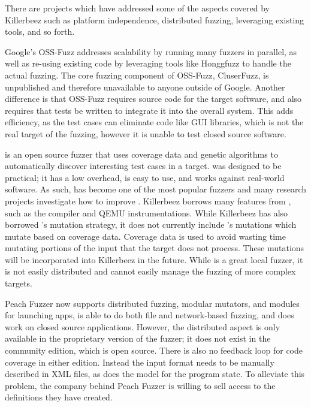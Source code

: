 There are projects which have addressed some of the aspects covered by Killerbeez
such as platform independence, distributed fuzzing, leveraging existing tools,
and so forth.

Google's OSS-Fuzz\cite{ossfuzz} addresses scalability by running many fuzzers
in parallel, as well as re-using existing code by leveraging tools like
Honggfuzz to handle the actual fuzzing. The core fuzzing component of OSS-Fuzz,
CluserFuzz, is unpublished and therefore unavailable to anyone outside of
Google.  Another difference is that OSS-Fuzz requires source code for the
target software, and also requires that tests be written to integrate it
into the overall system. This adds efficiency, as the test cases can eliminate
code like GUI libraries, which is not the real target of the fuzzing, however
it is unable to test closed source software.

\AFL{}\cite{afl} is an open source fuzzer that uses coverage data and genetic
algorithms to automatically discover interesting test cases in a target.  \AFL{}
was designed to be practical; it has a low overhead, is easy to use, and works
against real-world software. As such, \AFL{} has become one of the most popular
fuzzers and many research projects investigate how to improve \AFL{}. Killerbeez
borrows many features from \AFL{}, such as the compiler and QEMU
instrumentations. While Killerbeez has also borrowed \AFL{}'s mutation strategy,
it does not currently include \AFL{}'s mutations which mutate based on coverage
data. Coverage data is used to avoid wasting time mutating portions of the input
that the target does not process. These mutations will be incorporated into
Killerbeez in the future.  While \AFL{} is a great local fuzzer, it is not
easily distributed and cannot easily manage the fuzzing of more complex targets.

Peach Fuzzer\cite{peach} now supports distributed fuzzing, modular mutators, and
modules for launching apps, is able to do both file and network-based fuzzing,
and does work on closed source applications.  However, the distributed aspect
is only available in the proprietary version of the fuzzer; it does not exist
in the community edition, which is open source. There is also no feedback loop
for code coverage in either edition.  Instead the input format needs to be
manually described in XML files, as does the model for the program state. To
alleviate this problem, the company behind Peach Fuzzer is willing to sell
access to the definitions they have created.

